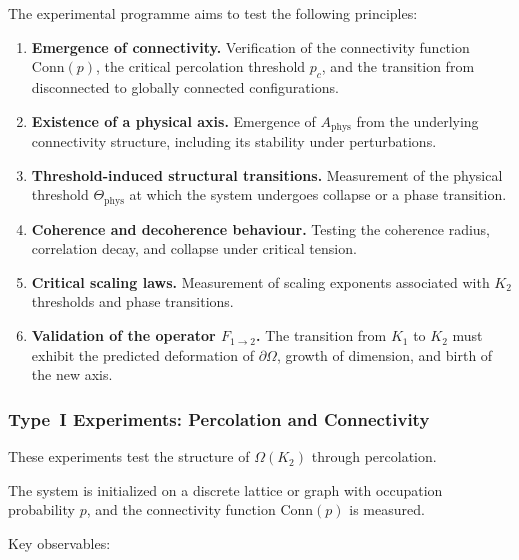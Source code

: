 The experimental programme aims to test the following principles:

\begin{enumerate}
    \item \textbf{Emergence of connectivity.}  
          Verification of the connectivity function $\mathrm{Conn}(p)$, 
          the critical percolation threshold $p_c$, and the transition 
          from disconnected to globally connected configurations.

    \item \textbf{Existence of a physical axis.}  
          Emergence of $A_{\mathrm{phys}}$ from the underlying 
          connectivity structure, including its stability under perturbations.

    \item \textbf{Threshold-induced structural transitions.}  
          Measurement of the physical threshold $\Theta_{\mathrm{phys}}$ 
          at which the system undergoes collapse or a phase transition.

    \item \textbf{Coherence and decoherence behaviour.}  
          Testing the coherence radius, correlation decay, and collapse 
          under critical tension.

    \item \textbf{Critical scaling laws.}  
          Measurement of scaling exponents associated with $K_2$ thresholds 
          and phase transitions.

    \item \textbf{Validation of the operator $F_{1 \rightarrow 2}$.}  
          The transition from $K_1$ to $K_2$ must exhibit the predicted 
          deformation of $\partial\Omega$, growth of dimension, and 
          birth of the new axis.
\end{enumerate}



\subsubsection{Type~I Experiments: Percolation and Connectivity}

These experiments test the structure of $\Omega(K_2)$ through percolation.

The system is initialized on a discrete lattice or graph with occupation 
probability $p$, and the connectivity function $\mathrm{Conn}(p)$ is measured.

Key observables:

